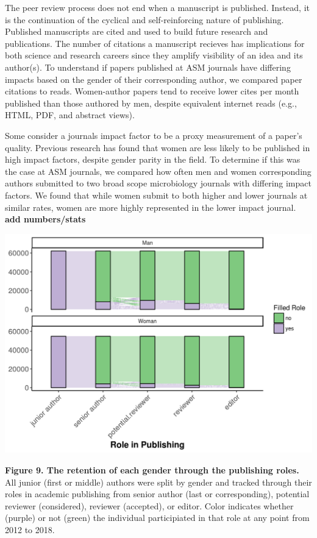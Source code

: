 \documentclass[11pt,]{article}
\begin{document}
The peer review process does not end when a manuscript is published.
Instead, it is the continuation of the cyclical and self-reinforcing
nature of publishing. Published manuscripts are cited and used to build
future research and publications. The number of citations a manuscript
recieves has implications for both science and research careers since
they amplify visibility of an idea and its author(s). To understand if
papers published at ASM journals have differing impacts based on the
gender of their corresponding author, we compared paper citations to
reads. Women-author papers tend to receive lower cites per month
published than those authored by men, despite equivalent internet reads
(e.g., HTML, PDF, and abstract views).

Some consider a journals impact factor to be a proxy measurement of a
paper's quality. Previous research has found that women are less likely
to be published in high impact factors, despite gender parity in the
field. To determine if this was the case at ASM journals, we compared
how often men and women corresponding authors submitted to two broad
scope microbiology journals with differing impact factors. We found that
while women submit to both higher and lower journals at similar rates,
women are more highly represented in the lower impact journal.
\textbf{add numbers/stats}

\includegraphics{Figure_5.png}

\textbf{Figure 9. The retention of each gender through the publishing
roles.} All junior (first or middle) authors were split by gender and
tracked through their roles in academic publishing from senior author
(last or corresponding), potential reviewer (considered), reviewer
(accepted), or editor. Color indicates whether (purple) or not (green)
the individual participiated in that role at any point from 2012 to
2018.
\end{document}
